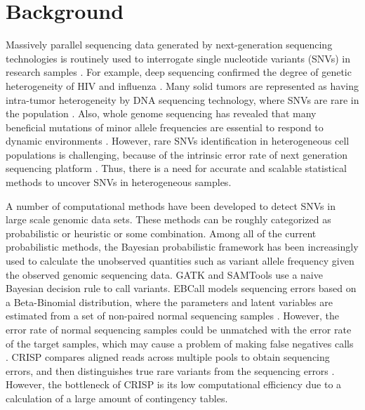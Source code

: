 \documentclass{bmcart}
\begin{document}

\section{Background}
Massively parallel sequencing data generated by next-generation sequencing technologies is routinely used to interrogate single nucleotide variants (SNVs) in research samples \cite{koboldt2013next}.
For example, deep sequencing confirmed the degree of genetic heterogeneity of HIV and influenza \cite{flaherty2011ultrasensitive, ghedin2011deep}.
Many solid tumors are represented as having intra-tumor heterogeneity by DNA sequencing technology, where SNVs are rare in the population \cite{navin2010inferring}.
Also, whole genome sequencing has revealed that many beneficial mutations of minor allele frequencies are essential to respond to dynamic environments \cite{kvitek2013whole}.
However, rare SNVs identification in heterogeneous cell populations is challenging, because of the intrinsic error rate of next generation sequencing platform \cite{shendure2008next}.
Thus, there is a need for accurate and scalable statistical methods to uncover SNVs in heterogeneous samples.

A number of computational methods have been developed to detect SNVs in large scale genomic data sets.
These methods can be roughly categorized as probabilistic or heuristic or some combination.
Among all of the current probabilistic methods, the Bayesian probabilistic framework has been increasingly used to calculate the unobserved quantities such as variant allele frequency given the observed genomic sequencing data.
GATK \cite{mckenna2010genome} and SAMTools \cite{li2009sequence} use a naive Bayesian decision rule to call variants.
EBCall models sequencing errors based on a Beta-Binomial distribution, where the parameters and latent variables are estimated from a set of non-paired normal sequencing samples \cite{shiraishi2013empirical}.
However, the error rate of normal sequencing samples could be unmatched with the error rate of the target samples, which may cause a problem of making false negatives calls \cite{wang2013detecting}.
CRISP compares aligned reads across multiple pools to obtain sequencing errors, and then distinguishes true rare variants from the sequencing errors \cite{bansal2010statistical}.
However, the bottleneck of CRISP is its low computational efficiency due to a calculation of a large amount of contingency tables.
\end{document}
